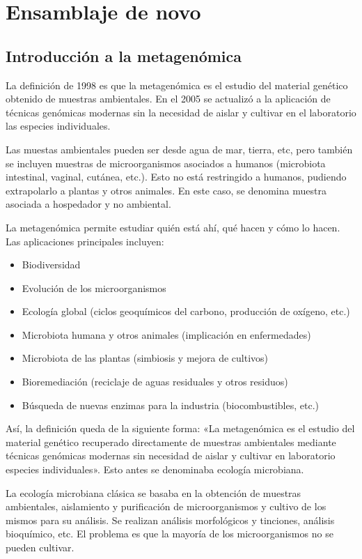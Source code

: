 \chapter{Ensamblaje de novo}
\section{Introducción a la metagenómica}
La definición de 1998 es que la metagenómica es el estudio del material genético obtenido de muestras ambientales. En el 2005 se actualizó a la aplicación de técnicas genómicas modernas sin la necesidad de aislar y cultivar en el laboratorio las especies individuales. 

Las muestas ambientales pueden ser desde agua de mar, tierra, etc, pero también se incluyen muestras de microorganismos asociados a humanos (microbiota intestinal, vaginal, cutánea, etc.). Esto no está restringido a humanos, pudiendo extrapolarlo a plantas y otros animales. En este caso, se denomina muestra asociada a hospedador y no ambiental. 

La metagenómica permite estudiar quién está ahí, qué hacen y cómo lo hacen. Las aplicaciones principales incluyen:
\begin{itemize}
\item Biodiversidad
\item Evolución de los microorganismos
\item Ecología global (ciclos geoquímicos del carbono, producción de oxígeno, etc.)
\item Microbiota humana y otros animales (implicación en enfermedades)
\item Microbiota de las plantas (simbiosis y mejora de cultivos)
\item Bioremediación (reciclaje de aguas residuales y otros residuos)
\item Búsqueda de nuevas enzimas para la industria (biocombustibles, etc.)
\end{itemize}

Así, la definición queda de la siguiente forma: «La metagenómica es el estudio del material genético recuperado directamente de muestras ambientales mediante técnicas genómicas modernas sin necesidad de aislar y cultivar en laboratorio especies individuales». Esto antes se denominaba ecología microbiana. 

La ecología microbiana clásica se basaba en la obtención de muestras ambientales, aislamiento y purificación de microorganismos y cultivo de los mismos para su análisis. Se realizan análisis morfológicos y tinciones, análisis bioquímico, etc. El problema es que la mayoría de los microorganismos no se pueden cultivar. 

